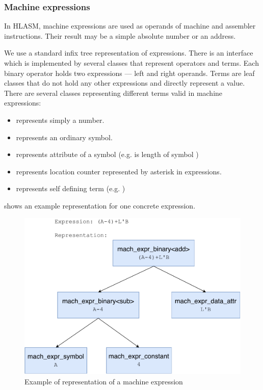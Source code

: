 \subsubsection{Machine expressions}
\label{mach_expr}
In HLASM, machine expressions are used as operands of machine and assembler instructions. Their result may be a simple absolute number or an address.

We use a standard infix tree representation of expressions. There is an interface  which is implemented by several classes that represent operators and terms. Each binary operator holds two expressions --- left and right operands. Terms are leaf classes that do not hold any other expressions and directly represent a value. There are several classes representing different terms valid in machine expressions:
\begin{itemize}
	\item {} represents simply a number.
	\item {} represents an ordinary symbol.
	\item {} represents attribute of a symbol (e.g.  is length of symbol )
	\item {} represents location counter represented by asterisk in expressions. 
	\item {} represents self defining term (e.g. )
\end{itemize}
 shows an example representation for one concrete expression.

\begin{figure}
	\centering
	\includegraphics[width=13cm]{img/mach_expr_example}
	\caption{Example of representation of a machine expression}
	\label{mach_expr_example}
\end{figure}

